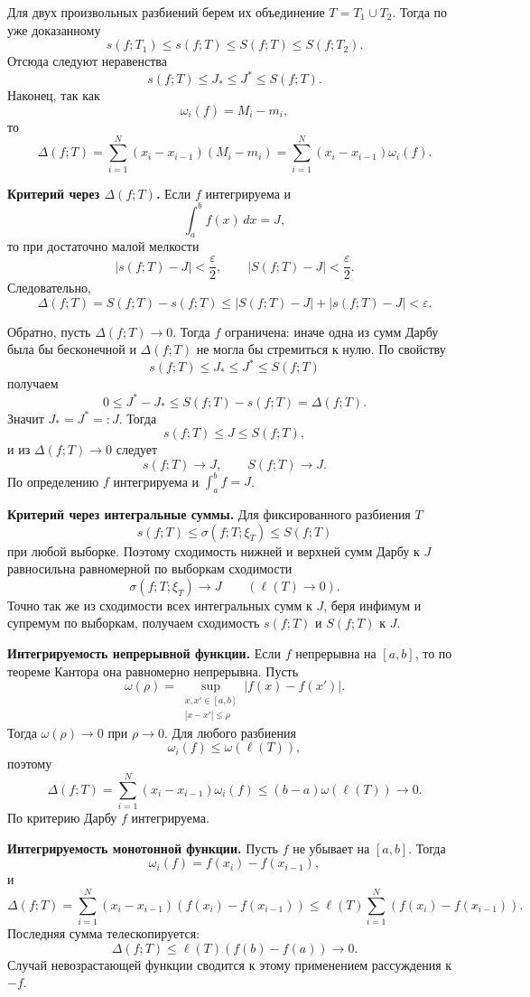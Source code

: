 \documentclass[12pt,a4paper]{article}
\newcommand{\eps}{\varepsilon}
\newcommand{\dd}{\,d}
\newcommand{\mesh}{\ell}
\newcommand{\osc}{\omega}
\begin{document}
Для двух произвольных разбиений берем их объединение \(T=T_1\cup T_2\). Тогда
по уже доказанному
\[
  s(f;T_1)\le s(f;T)\le S(f;T)\le S(f;T_2).
\]
Отсюда следуют неравенства
\[
  s(f;T)\le J_*\le J^*\le S(f;T).
\]
Наконец, так как
\[
  \osc_i(f)=M_i-m_i,
\]
то
\[
  \Delta(f;T)
  =
  \sum_{i=1}^N(x_i-x_{i-1})(M_i-m_i)
  =
  \sum_{i=1}^N(x_i-x_{i-1})\osc_i(f).
\]

\textbf{Критерий через \(\Delta(f;T)\).}
Если \(f\) интегрируема и
\[
  \int_a^b f(x)\dd x=J,
\]
то при достаточно малой мелкости
\[
  |s(f;T)-J|<\frac{\eps}{2},\qquad
  |S(f;T)-J|<\frac{\eps}{2}.
\]
Следовательно,
\[
  \Delta(f;T)=S(f;T)-s(f;T)
  \le |S(f;T)-J|+|s(f;T)-J|<\eps.
\]

Обратно, пусть \(\Delta(f;T)\to0\). Тогда \(f\) ограничена: иначе одна из сумм
Дарбу была бы бесконечной и \(\Delta(f;T)\) не могла бы стремиться к нулю.
По свойству
\[
  s(f;T)\le J_*\le J^*\le S(f;T)
\]
получаем
\[
  0\le J^*-J_*\le S(f;T)-s(f;T)=\Delta(f;T).
\]
Значит \(J_*=J^*=:J\). Тогда
\[
  s(f;T)\le J\le S(f;T),
\]
и из \(\Delta(f;T)\to0\) следует
\[
  s(f;T)\to J,\qquad S(f;T)\to J.
\]
По определению \(f\) интегрируема и \(\int_a^b f=J\).

\textbf{Критерий через интегральные суммы.}
Для фиксированного разбиения \(T\)
\[
  s(f;T)\le \sigma(f;T;\xi_T)\le S(f;T)
\]
при любой выборке. Поэтому сходимость нижней и верхней сумм Дарбу к \(J\)
равносильна равномерной по выборкам сходимости
\[
  \sigma(f;T;\xi_T)\to J\qquad(\mesh(T)\to0).
\]
Точно так же из сходимости всех интегральных сумм к \(J\), беря инфимум и
супремум по выборкам, получаем сходимость \(s(f;T)\) и \(S(f;T)\) к \(J\).

\textbf{Интегрируемость непрерывной функции.}
Если \(f\) непрерывна на \([a,b]\), то по теореме Кантора она равномерно
непрерывна. Пусть
\[
  \omega(\rho)=
  \sup_{\substack{x,x'\in[a,b]\\ |x-x'|\le\rho}}|f(x)-f(x')|.
\]
Тогда \(\omega(\rho)\to0\) при \(\rho\to0\). Для любого разбиения
\[
  \osc_i(f)\le\omega(\mesh(T)),
\]
поэтому
\[
  \Delta(f;T)
  =
  \sum_{i=1}^N(x_i-x_{i-1})\osc_i(f)
  \le
  (b-a)\omega(\mesh(T))\to0.
\]
По критерию Дарбу \(f\) интегрируема.

\textbf{Интегрируемость монотонной функции.}
Пусть \(f\) не убывает на \([a,b]\). Тогда
\[
  \osc_i(f)=f(x_i)-f(x_{i-1}),
\]
и
\[
  \Delta(f;T)
  =
  \sum_{i=1}^N(x_i-x_{i-1})(f(x_i)-f(x_{i-1}))
  \le
  \mesh(T)\sum_{i=1}^N(f(x_i)-f(x_{i-1})).
\]
Последняя сумма телескопируется:
\[
  \Delta(f;T)\le \mesh(T)(f(b)-f(a))\to0.
\]
Случай невозрастающей функции сводится к этому применением рассуждения к
\(-f\).
\end{document}
